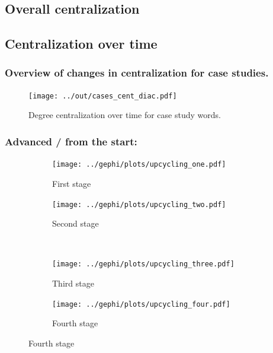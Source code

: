 \documentclass[a4paper]{scrartcl}
\begin{document}
  \subsection{Overall centralization}

  \subsection{Centralization over time}

    \subsubsection{Overview of changes in centralization for case studies.}

      \begin{figure}[H]
        \caption{Degree centralization over time for case study words.}
        \centering
        \texttt{[image: ../out/cases\_cent\_diac.pdf]}
      \end{figure}

    \subsubsection{Advanced / from the start: }

      \begin{figure}[H]
        \caption{Social network of diffusion for  over time.}
        \centering
        \begin{subfigure}{.45\linewidth}
          \caption{First stage}
          \centering
          \texttt{[image: ../gephi/plots/upcycling\_one.pdf]}
        \end{subfigure}
        \begin{subfigure}{.45\linewidth}
          \caption{Second stage}
          \centering
          \texttt{[image: ../gephi/plots/upcycling\_two.pdf]}
        \end{subfigure}\\
        \begin{subfigure}{.45\linewidth}
          \caption{Third stage}
          \centering
          \texttt{[image: ../gephi/plots/upcycling\_three.pdf]}
        \end{subfigure}
        \begin{subfigure}{.45\linewidth}
          \caption{Fourth stage}
          \centering
          \texttt{[image: ../gephi/plots/upcycling\_four.pdf]}
        \end{subfigure}
      \end{figure}
\end{document}
